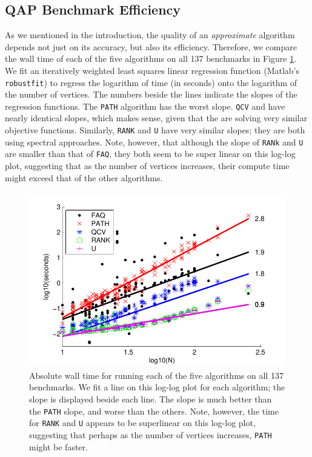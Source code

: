 \documentclass[11pt]{article}
\begin{document}

\subsection{QAP Benchmark Efficiency} %
\label{sub:subsection_name}

As we mentioned in the introduction, the quality of an \emph{approximate} algorithm depends not just on its accuracy, but also its efficiency.  Therefore, we compare the wall time of each of the five algorithms on all 137 benchmarks in Figure \ref{fig:allEfficiency}.  We fit an iteratively weighted least squares linear regression function (Matlab's \texttt{robustfit}) to regress the logarithm of time (in seconds) onto the logarithm of the number of vertices.  The numbers beside the lines indicate the slopes of the regression functions.  The \texttt{PATH} algorithm has the worst slope.  \texttt{QCV} and \FAQ have nearly identical slopes, which makes sense, given that the are solving very similar objective functions.  Similarly, \texttt{RANK} and \texttt{U} have very similar slopes; they are both using spectral approaches.  Note, however, that although the slope of \texttt{RANk} and \texttt{U} are smaller than that of \texttt{FAQ}, they both seem to be super linear on this log-log plot, suggesting that as the number of vertices increases, their compute time might exceed that of the other algorithms.  

\begin{figure}[htbp]
	\centering
		\includegraphics[height=3in]{../figs/allEfficiency.pdf}
	\caption{Absolute wall time for running each of the five algorithms on all 137 benchmarks. We fit a line on this log-log plot for each algorithm; the slope is displayed beside each line. The \FAQ slope is much better than the \texttt{PATH} slope, and worse than the others.  Note, however, the time for \texttt{RANK} and \texttt{U} appears to be superlinear on this log-log plot, suggesting that perhaps as the number of vertices increases, \texttt{PATH} might be faster. }
	\label{fig:allEfficiency}
\end{figure}
\end{document}

